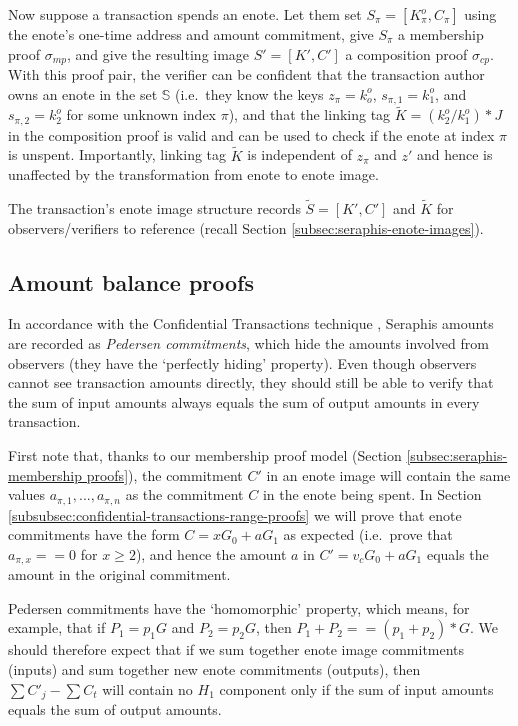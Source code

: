 Now suppose a transaction spends an enote. Let them set $S_{\pi} = [K^o_{\pi}, C_{\pi}]$ using the enote's one-time address and amount commitment, give $S_{\pi}$ a membership proof $\sigma_{mp}$, and give the resulting image $S' = [K', C']$ a composition proof $\sigma_{cp}$. With this proof pair, the verifier can be confident that the transaction author owns an enote in the set $\mathbb{S}$ (i.e.\ they know the keys $z_{\pi} = k^o_o$, $s_{\pi,1} = k^o_1$, and $s_{\pi,2} = k^o_2$ for some unknown index $\pi$), and that the linking tag $\tilde{K} = (k^o_2/k^o_1)*J$ in the composition proof is valid and can be used to check if the enote at index $\pi$ is unspent. Importantly, linking tag $\tilde{K}$ is independent of $z_{\pi}$ and $z'$ and hence is unaffected by the transformation from enote to enote image.

The transaction's enote image structure records $\tilde{S} = [K', C']$ and $\tilde{K}$ for observers/verifiers to reference (recall Section \ref{subsec:seraphis-enote-images}).


\subsection{Amount balance proofs}
\label{subsec:seraphis-amount-balance-proofs}

In accordance with the Confidential Transactions technique \cite{maxwell-ct-2}, Seraphis amounts are recorded as {\em Pedersen commitments}, which hide the amounts involved from observers (they have the `perfectly hiding' property). Even though observers cannot see transaction amounts directly, they should still be able to verify that the sum of input amounts always equals the sum of output amounts in every transaction.

First note that, thanks to our membership proof model (Section \ref{subsec:seraphis-membership proofs}), the commitment $C'$ in an enote image will contain the same values $a_{\pi,1},...,a_{\pi,n}$ as the commitment $C$ in the enote being spent. In Section \ref{subsubsec:confidential-transactions-range-proofs} we will prove that enote commitments have the form $C = x G_0 + a G_1$ as expected (i.e.\ prove that $a_{\pi,x} == 0$ for $x \geq 2$), and hence the amount $a$ in $C' = v_c G_0 + a G_1$ equals the amount in the original commitment.

Pedersen commitments have the `homomorphic' property, which means, for example, that if $P_1 = p_1 G$ and $P_2 = p_2 G$, then $P_1 + P_2 == (p_1 + p_2)*G$. We should therefore expect that if we sum together enote image commitments (inputs) and sum together new enote commitments (outputs), then $\sum C'_j - \sum C_t$ will contain no $H_1$ component only if the sum of input amounts equals the sum of output amounts.


